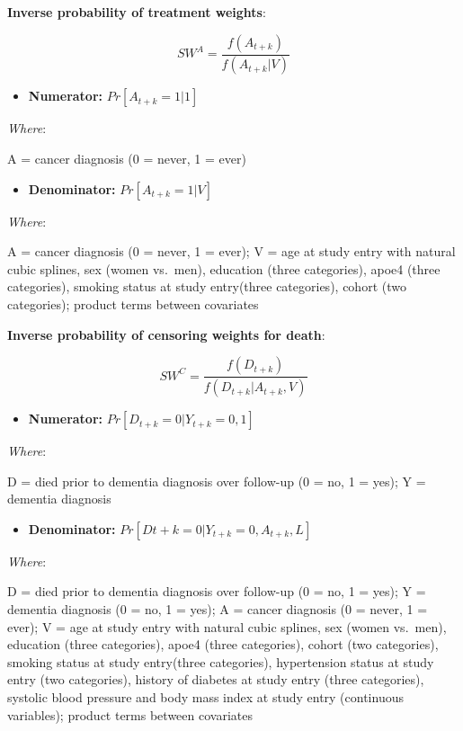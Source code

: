 \documentclass[
]{book}
\providecommand{\tightlist}{%
  \setlength{\itemsep}{0pt}\setlength{\parskip}{0pt}}
\begin{document}
\textbf{Inverse probability of treatment weights}:

\[SW^A = \frac{f(A_{t+k})}{f(A_{t+k}|V)}\]

\begin{itemize}
\tightlist
\item
  \textbf{Numerator:} \(Pr[A_{t+k} = 1|1]\)
\end{itemize}

\emph{Where}:

A = cancer diagnosis (0 = never, 1 = ever)

\begin{itemize}
\tightlist
\item
  \textbf{Denominator:} \(Pr[A_{t+k} = 1|V]\)
\end{itemize}

\emph{Where}:

A = cancer diagnosis (0 = never, 1 = ever); V = age at study entry with natural cubic splines, sex (women vs.~men), education (three categories), apoe4 (three categories), smoking status at study entry(three categories), cohort (two categories); product terms between covariates

\textbf{Inverse probability of censoring weights for death}:

\[SW^C = \frac{f(D_{t+k})}{f(D_{t+k}|A_{t+k},V)}\]

\begin{itemize}
\tightlist
\item
  \textbf{Numerator:} \(Pr[D_{t+k} = 0|Y_{t+k} = 0, 1]\)
\end{itemize}

\emph{Where}:

D = died prior to dementia diagnosis over follow-up (0 = no, 1 = yes); Y = dementia diagnosis

\begin{itemize}
\tightlist
\item
  \textbf{Denominator:} \(Pr[D{t+k} = 0|Y_{t+k} = 0, A_{t+k},L]\)
\end{itemize}

\emph{Where}:

D = died prior to dementia diagnosis over follow-up (0 = no, 1 = yes); Y = dementia diagnosis (0 = no, 1 = yes); A = cancer diagnosis (0 = never, 1 = ever); V = age at study entry with natural cubic splines, sex (women vs.~men), education (three categories), apoe4 (three categories), cohort (two categories), smoking status at study entry(three categories), hypertension status at study entry (two categories), history of diabetes at study entry (three categories), systolic blood pressure and body mass index at study entry (continuous variables); product terms between covariates
\end{document}
